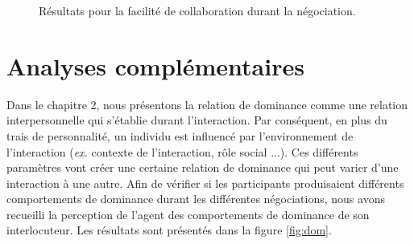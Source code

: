 	\begin{figure}[h]
		
		
		\caption{Résultats pour la facilité de collaboration durant la négociation.}
		\label{fig:aise}
	\end{figure}
	
	
	\section{Analyses complémentaires}
	Dans le chapitre 2, nous présentons la relation de dominance comme une relation interpersonnelle qui s'établie durant l'interaction. 
	Par conséquent, en plus du trais de personnalité, un individu est influencé par l'environnement de l'interaction (\textit{ex.} contexte de l'interaction, rôle social ...). Ces différents paramètres vont créer une certaine relation de dominance qui peut varier d'une interaction à une autre.  
	Afin de vérifier si les participants produisaient différents comportements de dominance durant les différentes négociations, nous avons recueilli la perception de l'agent des comportements de dominance de son interlocuteur.  Les résultats sont présentés dans la figure \ref{fig:dom}.
	
